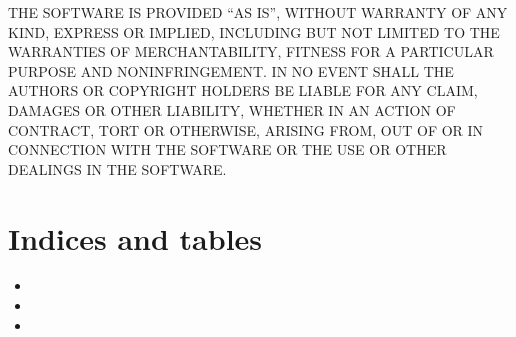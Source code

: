 \documentclass[letterpaper,10pt,english]{sphinxmanual}
\begin{document}
THE SOFTWARE IS PROVIDED “AS IS”, WITHOUT WARRANTY OF ANY KIND, EXPRESS OR
IMPLIED, INCLUDING BUT NOT LIMITED TO THE WARRANTIES OF MERCHANTABILITY,
FITNESS FOR A PARTICULAR PURPOSE AND NONINFRINGEMENT. IN NO EVENT SHALL THE
AUTHORS OR COPYRIGHT HOLDERS BE LIABLE FOR ANY CLAIM, DAMAGES OR OTHER
LIABILITY, WHETHER IN AN ACTION OF CONTRACT, TORT OR OTHERWISE, ARISING FROM,
OUT OF OR IN CONNECTION WITH THE SOFTWARE OR THE USE OR OTHER DEALINGS IN THE
SOFTWARE.


\chapter{Indices and tables}
\label{\detokenize{index:indices-and-tables}}\begin{itemize}
\item {} 

\item {} 

\item {} 

\end{itemize}



\renewcommand{\indexname}{Index}
\printindex
\end{document}
